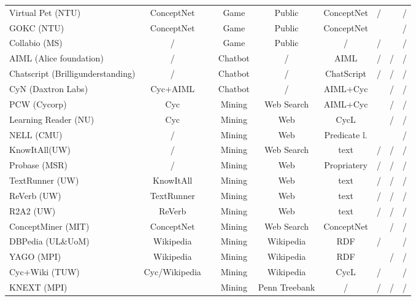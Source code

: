 \begin{landscape}
\begin{table}[htb]
\begin{adjustbox}{width=1.6\textwidth}
\begin{tabular}{lclcccccc}
		Virtual Pet (NTU) & ConceptNet  &  \parencite{Kuo2009}  & Game &  Public & ConceptNet  & /  & \checkmark  & /  \\
		GOKC (NTU) & ConceptNet  & \parencite{Kuo2010}  & Game & Public  & ConceptNet  & \checkmark  & \checkmark  & /  \\
		Collabio (MS) & /  & \parencite{Bernstein2010}  & Game & Public  & /  & /  & \checkmark  & /  \\
		AIML (Alice foundation) & /  & \parencite{Wallace2003}  & Chatbot & /  & AIML  & /  & /  & /  \\
		Chatscript (Brilligunderstanding) & /  & \parencite{Wilcox2011}  & Chatbot & /  & ChatScript  & /  & /  & /  \\
		CyN (Daxtron Labs) & Cyc+AIML  & \parencite{Wilcox2011}  & Chatbot & /  & AIML+Cyc  & \checkmark  & /  & /  \\
	    PCW (Cycorp) & Cyc  & \parencite{Matuszek2004}  & Mining & Web Search  & AIML+Cyc  & \checkmark  & /  & /  \\
 		Learning Reader (NU) & Cyc & \parencite{Forbus2007} & Mining & Web & CycL & \checkmark & / & / \\
		NELL (CMU) & / & \parencite{Mitchell2015} & Mining & Web & Predicate l. & \checkmark & \checkmark & / \\ 
		KnowItAll(UW) & / & \parencite{Etzioni2004} & Mining & Web Search & text & / & / & / \\
		Probase (MSR) & / & \parencite{Wu2012}  & Mining & Web & Propriatery & / & / & / \\
        TextRunner (UW) & KnowItAll & \parencite{Soderland2007} & Mining & Web & text & / & / & / \\
		ReVerb (UW) & TextRunner & \parencite{Fader2011} & Mining & Web & text & / & / & / \\
		R2A2 (UW) & ReVerb & \parencite{Etzioni2011} & Mining & Web & text & / & / & / \\
		ConceptMiner (MIT) & ConceptNet & \parencite{Eslick2006} &Mining & Web Search & ConceptNet & \checkmark & / & / \\ 
		DBPedia (UL\&UoM) & Wikipedia & \parencite{Lehmann2015} & Mining & Wikipedia &  RDF & / &\checkmark & / \\
		YAGO (MPI) & Wikipedia & \parencite{Suchanek2008} & Mining & Wikipedia &  RDF & \checkmark & / & / \\
		Cyc+Wiki (TUW) & Cyc/Wikipedia & \parencite{Medelyan2008} & Mining & Wikipedia &  CycL & / &\checkmark & / \\
		KNEXT (MPI) & \ & \parencite{Schuber2002} & Mining & Penn Treebank &  / & / & / & / \\

\end{tabular}
\end{adjustbox}
\end{table}
\end{landscape}

